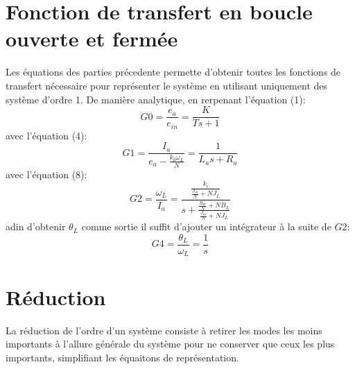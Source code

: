 \documentclass{udes_rapport} %
\begin{document}
\section{Fonction de transfert en boucle ouverte et fermée}
Les équations des parties précedente permette d'obtenir toutes les fonctions de transfert nécessaire pour représenter le système en utilisant uniquement des système d'ordre 1. De manière analytique, en rerpenant l'équation (1):
\[	G0 = \frac{e_a}{e_{in}} = \frac{K}{Ts + 1}	\]
avec l'équation (4):
\[	G1 = \frac{I_a}{e_a - \frac{k_b \omega_L}{N}} = \frac{1}{L_a s + R_a}						\]
avec l'équation (8):
\[	G2 = \frac{\omega_L}{I_a} = \frac{\frac{k_i}{\frac{J_m}{N}+N J_L}}{s + \frac{\frac{B_m}{N} + N B_L}{\frac{J_m}{N}+N J_L}}	\]
adin d'obtenir $\theta _L$ comme sortie il suffit d'ajouter un intégrateur à la suite de $G2$:
\[	G4 = \frac{\theta _L}{\omega _L} = \frac{1}{s}	\]


\section{Réduction}
La réduction de l'ordre d'un système consiste à retirer les modes les moins importants à l'allure générale du système pour ne conserver que ceux les plus importants, simplifiant les équaitons de représentation.
\end{document}

